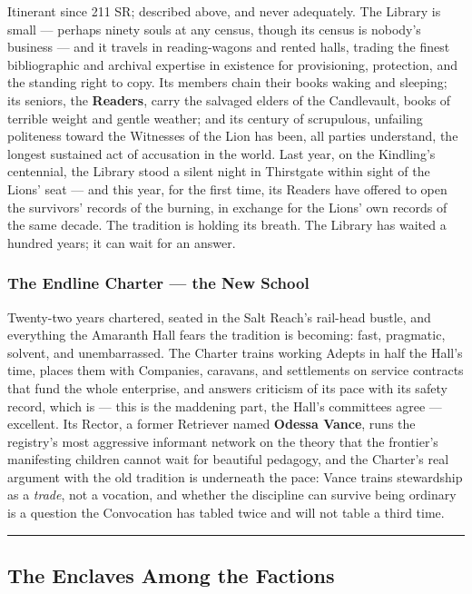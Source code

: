 Itinerant since 211 SR; described above, and never adequately. The Library is small --- perhaps ninety souls at any census, though its census is nobody's business --- and it travels in reading-wagons and rented halls, trading the finest bibliographic and archival expertise in existence for provisioning, protection, and the standing right to copy. Its members chain their books waking and sleeping; its seniors, the \textbf{Readers}, carry the salvaged elders of the Candlevault, books of terrible weight and gentle weather; and its century of scrupulous, unfailing politeness toward the Witnesses of the Lion has been, all parties understand, the longest sustained act of accusation in the world. Last year, on the Kindling's centennial, the Library stood a silent night in Thirstgate within sight of the Lions' seat --- and this year, for the first time, its Readers have offered to open the survivors' records of the burning, in exchange for the Lions' own records of the same decade. The tradition is holding its breath. The Library has waited a hundred years; it can wait for an answer.

\subsubsection{The Endline Charter --- the New School}

Twenty-two years chartered, seated in the Salt Reach's rail-head bustle, and everything the Amaranth Hall fears the tradition is becoming: fast, pragmatic, solvent, and unembarrassed. The Charter trains working Adepts in half the Hall's time, places them with Companies, caravans, and settlements on service contracts that fund the whole enterprise, and answers criticism of its pace with its safety record, which is --- this is the maddening part, the Hall's committees agree --- excellent. Its Rector, a former Retriever named \textbf{Odessa Vance}, runs the registry's most aggressive informant network on the theory that the frontier's manifesting children cannot wait for beautiful pedagogy, and the Charter's real argument with the old tradition is underneath the pace: Vance trains stewardship as a \textit{trade}, not a vocation, and whether the discipline can survive being ordinary is a question the Convocation has tabled twice and will not table a third time.

\medskip\hrule\medskip

\subsection{The Enclaves Among the Factions}

